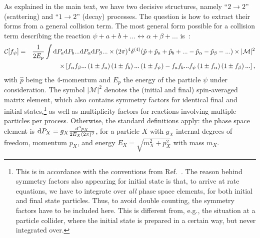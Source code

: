 As explained in the main text, we have two decisive structures, namely ``$2 \rightarrow 2$'' (scattering) and ``$1\rightarrow 2$'' (decay) processes. The question is how to extract their forms from a general collision term. The most general form possible for a collision term describing the reaction $\psi + a + b + ... \leftrightarrow \alpha + \beta + ...$ is~\cite{Kolb:1990vq}:
\begin{eqnarray}
 \mathcal{C}[f_\psi] &=& \frac{1}{2 E_p} \int {\rm d} P_a {\rm d} P_b ... {\rm d} P_\alpha {\rm d} P_\beta ... \times (2\pi)^4 \delta^{(4)}(\hat p + \hat p_a +\hat p_b +... -\hat p_\alpha - \hat p_\beta - ...) \times |\mathcal{M}|^2 \nonumber\\
&& \times \left[f_\alpha f_\beta ... \left(1\pm f_a\right) \left(1\pm f_b\right) ... \left(1 \pm f_\psi\right) - f_a f_b ... f_\psi \left(1 \pm f_\alpha\right) \left(1\pm f_\beta\right) ... \right] ,
 \label{eq:collision-general}
\end{eqnarray}
with $\hat p$ being the 4-momentum and $E_p$ the energy of the particle $\psi$ under consideration. The symbol $|\mathcal{M}|^2$ denotes the (initial and final) spin-averaged matrix element, which also contains symmetry factors for identical final and initial states,\footnote{This is in accordance with the conventions from Ref.~\cite{Kolb:1990vq}. The reason behind symmetry factors also appearing for initial state is that, to arrive at rate equations, we have to integrate over \emph{all} phase space elements, for both initial and final state particles. Thus, to avoid double counting, the symmetry factors have to be included here. This is different from, e.g., the situation at a particle collider, where the initial state is prepared in a certain way, but never integrated over.} as well as multiplicity factors for reactions involving multiple particles per process. Otherwise, the standard definitions apply: the phase space element is ${\rm d} P_X = g_X \frac{{\rm d}^3 p_X}{2 E_X (2\pi)^3}$, for a particle $X$ with $g_X$ internal degrees of freedom, momentum $p_X$, and energy $E_X = \sqrt{m_X^2 + p_X^2}$ with mass $m_X$.

